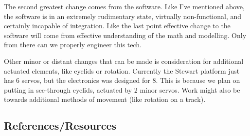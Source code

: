 \documentclass[a4paper, 10pt]{article}
\begin{document}
	The second greatest change comes from the software. Like I've mentioned above, the software is in an extremely rudimentary state, virtually non-functional, and certainly incapable of integration. Like the last point effective change to the software will come from effective understanding of the math and modelling. Only from there can we properly engineer this tech.
	
	Other minor or distant changes that can be made is consideration for additional actuated elements, like eyelids or rotation. Currently the Stewart platform just has 6 servos, but the electronics was designed for 8. This is because we plan on putting in see-through eyelids, actuated by 2 minor servos. Work might also be towards additional methods of movement (like rotation on a track). 
		
	\subsection{References/Resources}
\end{document}
